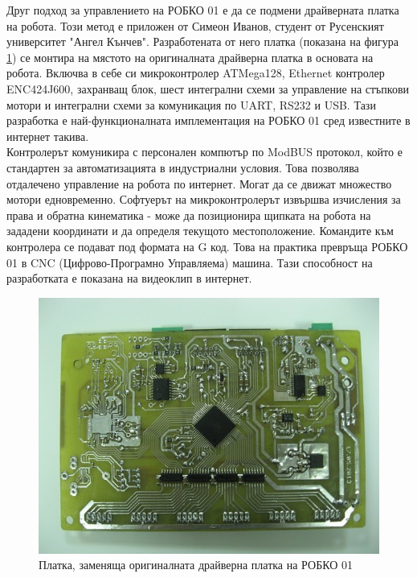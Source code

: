 Друг подход за управлението на РОБКО 01 е да се подмени драйверната платка на робота. Този метод е приложен от Симеон Иванов, студент от Русенският университет "Ангел Кънчев".
\cite{robko-atmega128}
Разработената от него платка (показана на фигура \ref{fig:new_cntrl_brd}) се монтира на мястото на оригиналната драйверна платка в основата на робота. Включва в себе си микроконтролер ATMega128, Ethernet контролер ENC424J600, захранващ блок, шест интегрални схеми за управление на стъпкови мотори и интегрални схеми за комуникация по UART, RS232 и USB. Тази разработка е най-функционалната имплементация на РОБКО 01 сред известните в интернет такива.\\
\indent{}
Контролерът комуникира с персонален компютър по ModBUS протокол, който е стандартен за автоматизацията в индустриални условия. Това позволява отдалечено управление на робота по интернет. Могат да се движат множество мотори едновременно. Софтуерът на микроконтролерът извършва изчисления за права и обратна кинематика - може да позиционира щипката на робота на зададени координати и да определя текущото местоположение. Командите към контролера се подават под формата на G код. Това на практика превръща РОБКО 01 в CNC (Цифрово-Програмно Управляема) машина. Тази способност на разработката е показана на видеоклип в интернет.
\cite{robko-cnc}
\begin{figure}
    \centering
    \includegraphics[width=\linewidth]{pictures/robko_new_driver_board.jpg}
    \caption{Платка, заменяща оригиналната драйверна платка на РОБКО 01}
    \label{fig:new_cntrl_brd}
\end{figure}
